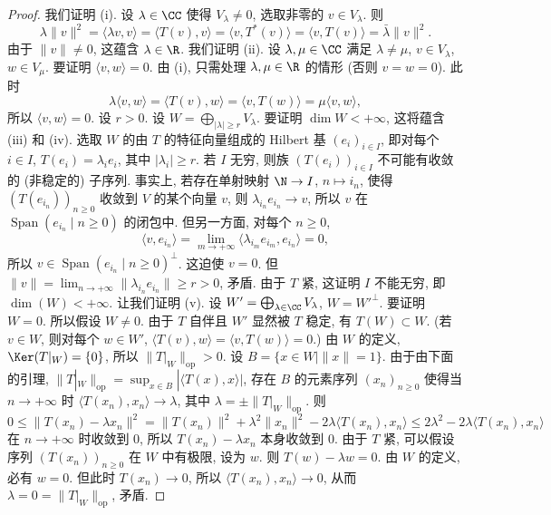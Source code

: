 \begin{proof}
我们证明 (i). 设 $\lambda \in \CC$ 使得 $V_{\lambda} \neq 0$, 选取非零的 $v \in V_{\lambda}$. 则
\[
\lambda\|v\|^2 = \langle \lambda v, v \rangle = \langle T(v), v \rangle = \langle v, T^*(v) \rangle = \langle v, T(v) \rangle = \bar{\lambda}\|v\|^2.
\]
由于 $\|v\| \neq 0$, 这蕴含 $\lambda \in \R$.
我们证明 (ii). 设 $\lambda, \mu \in \CC$ 满足 $\lambda \neq \mu$, $v \in V_{\lambda}$, $w \in V_{\mu}$. 要证明 $\langle v, w \rangle = 0$. 由 (i), 只需处理 $\lambda, \mu \in \R$ 的情形 (否则 $v = w = 0$). 此时
\[
\lambda\langle v, w \rangle = \langle T(v), w \rangle = \langle v, T(w) \rangle = \mu\langle v, w \rangle,
\]
所以 $\langle v, w \rangle = 0$.
设 $r > 0$. 设 $W = \bigoplus_{|\lambda| \geq r}V_{\lambda}$. 要证明 $\dim W < +\infty$, 这将蕴含 (iii) 和 (iv). 选取 $W$ 的由 $T$ 的特征向量组成的 Hilbert 基 $(e_i)_{i \in I}$, 即对每个 $i \in I$, $T(e_i) = \lambda_ie_i$, 其中 $|\lambda_i| \geq r$. 若 $I$ 无穷, 则族 $(T(e_i))_{i \in I}$ 不可能有收敛的 (非稳定的) 子序列. 事实上, 若存在单射映射 $\N \to I$, $n \longmapsto i_n$, 使得 $(T(e_{i_n}))_{n \geq 0}$ 收敛到 $V$ 的某个向量 $v$, 则 $\lambda_{i_n}e_{i_n} \to v$, 所以 $v$ 在 $\operatorname{Span}(e_{i_n} \mid n \geq 0)$ 的闭包中. 但另一方面, 对每个 $n \geq 0$,
\[
\langle v, e_{i_n} \rangle = \lim_{m \to +\infty}\langle \lambda_{i_m}e_{i_m}, e_{i_n} \rangle = 0,
\]
所以 $v \in \operatorname{Span}(e_{i_n} \mid n \geq 0)^{\perp}$. 这迫使 $v = 0$. 但 $\|v\| = \lim_{n \to +\infty}\|\lambda_{i_n}e_{i_n}\| \geq r > 0$, 矛盾. 由于 $T$ 紧, 这证明 $I$ 不能无穷, 即 $\dim(W) < +\infty$.
让我们证明 (v). 设 $W' = \bigoplus_{\lambda \in \CC}V_{\lambda}$, $W = W'^{\perp}$. 要证明 $W = 0$. 所以假设 $W \neq 0$. 由于 $T$ 自伴且 $W'$ 显然被 $T$ 稳定, 有 $T(W) \subset W$. (若 $v \in W$, 则对每个 $w \in W'$, $\langle T(v), w \rangle = \langle v, T(w) \rangle = 0$.) 由 $W$ 的定义, $\Ker(T|_W) = \{0\}$, 所以 $\|T|_W\|_{\mathrm{op}} > 0$. 设 $B = \{x \in W \mid \|x\| = 1\}$. 由于由下面的引理, $\|T|_W\|_{\mathrm{op}} = \sup_{x \in B}|\langle T(x), x \rangle|$, 存在 $B$ 的元素序列 $(x_n)_{n \geq 0}$ 使得当 $n \to +\infty$ 时 $\langle T(x_n), x_n \rangle \to \lambda$, 其中 $\lambda = \pm\|T|_W\|_{\mathrm{op}}$. 则
\[
0 \leq \|T(x_n) - \lambda x_n\|^2 = \|T(x_n)\|^2 + \lambda^2\|x_n\|^2 - 2\lambda\langle T(x_n), x_n \rangle \leq 2\lambda^2 - 2\lambda\langle T(x_n), x_n \rangle
\]
在 $n \to +\infty$ 时收敛到 $0$, 所以 $T(x_n) - \lambda x_n$ 本身收敛到 $0$. 由于 $T$ 紧, 可以假设序列 $(T(x_n))_{n \geq 0}$ 在 $W$ 中有极限, 设为 $w$. 则 $T(w) - \lambda w = 0$. 由 $W$ 的定义, 必有 $w = 0$. 但此时 $T(x_n) \to 0$, 所以 $\langle T(x_n), x_n \rangle \to 0$, 从而 $\lambda = 0 = \|T|_W\|_{\mathrm{op}}$, 矛盾.
\end{proof}

